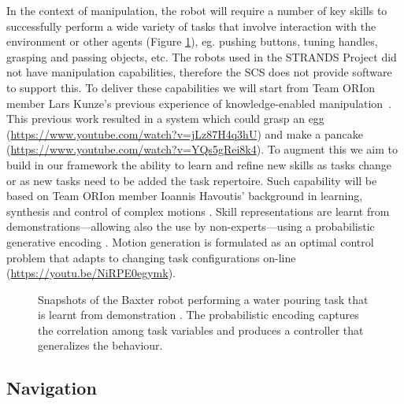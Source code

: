 \documentclass[runningheads,a4paper]{llncs}
\newcommand{\teamori}{Team ORIon}
\begin{document}
In the context of manipulation, the robot will require a number of key skills 
to successfully perform a wide
variety of tasks that involve interaction with the environment or other
agents (Figure \ref{fig:baxter_water_task}), eg. pushing buttons, tuning handles, grasping and passing objects, etc. 
% 
The robots used in the STRANDS Project did not have manipulation capabilities, therefore the SCS does not provide software to support this. To deliver these capabilities we will start from \teamori{} member Lars Kunze's previous experience of knowledge-enabled manipulation~\cite{kunze15aij}. This previous work resulted in a system which could grasp an egg (\url{https://www.youtube.com/watch?v=jLz87H4q3hU}) and make a pancake (\url{https://www.youtube.com/watch?v=YQs5gRei8k4}). 
%
To augment this we aim to build in our framework the ability
to learn and refine new skills as tasks change or as new tasks need to be added
the task repertoire. Such capability will be based on \teamori{} 
member Ioannis Havoutis' background in learning, synthesis and control of 
complex motions \cite{Havoutis16SSRR}. Skill representations
are learnt from demonstrations---allowing also the use by non-experts---using a probabilistic generative encoding %
\cite{Havoutis17ICRA}. Motion generation is formulated as an optimal
control problem that adapts to changing task configurations on-line \cite{Zeestraten17IROS,Zeestraten2017-RAL} (\url{https://youtu.be/NiRPE0egymk}).
\begin{figure}[!t]
	\centering
	\vspace{-10pt}%
	\caption{Snapshots of the Baxter robot performing a water pouring task that
	is learnt from demonstration \cite{Zeestraten2017-RAL}. The probabilistic
	encoding captures the correlation among task variables and produces a
	controller that generalizes the behaviour.}
	\label{fig:baxter_water_task}
	\vspace{-3ex}
\end{figure}

\subsection{Navigation}
\end{document}
